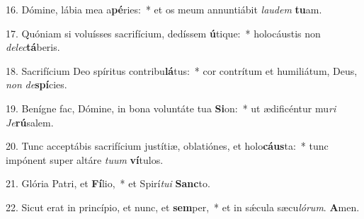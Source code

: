 16. Dómine, lábia mea a\textbf{pé}ries:~* et os meum annuntiábit \textit{lau}\textit{dem} \textbf{tu}am.

17. Quóniam si voluísses sacrifícium, dedíssem \textbf{ú}tique:~* holocáustis non \textit{de}\textit{lec}\textbf{tá}beris.

18. Sacrifícium Deo spíritus contribu\textbf{lá}tus:~* cor contrítum et humiliátum, Deus, \textit{non} \textit{de}\textbf{spí}cies.

19. Benígne fac, Dómine, in bona voluntáte tua \textbf{Si}on:~* ut ædificéntur mu\textit{ri} \textit{Je}\textbf{rú}salem.

20. Tunc acceptábis sacrifícium justítiæ, oblatiónes, et holo\textbf{cáus}ta:~* tunc impónent super altáre \textit{tu}\textit{um} \textbf{ví}tulos.

21. Glória Patri, et \textbf{Fí}lio,~* et Spirí\textit{tu}\textit{i} \textbf{Sanc}to.

22. Sicut erat in princípio, et nunc, et \textbf{sem}per,~* et in s\'{\ae}cula sæcu\textit{ló}\textit{rum}. \textbf{A}men.